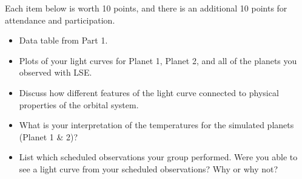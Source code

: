 Each item below is worth 10 points, and there is an additional 10 points for attendance and participation.

\begin{itemize}
	\item Data table from Part 1.
	
	\item Plots of your light curves for Planet 1, Planet 2, and all of the planets you observed with LSE. 
	
	\item Discuss how different features of the light curve connected to physical
	properties of the orbital system.
	
	\item What is your interpretation of the
	temperatures for the simulated planets (Planet 1 \& 2)?
	
	\item List which scheduled observations your group performed. Were you able to see a light curve from your scheduled observations? Why or why not?
\end{itemize}